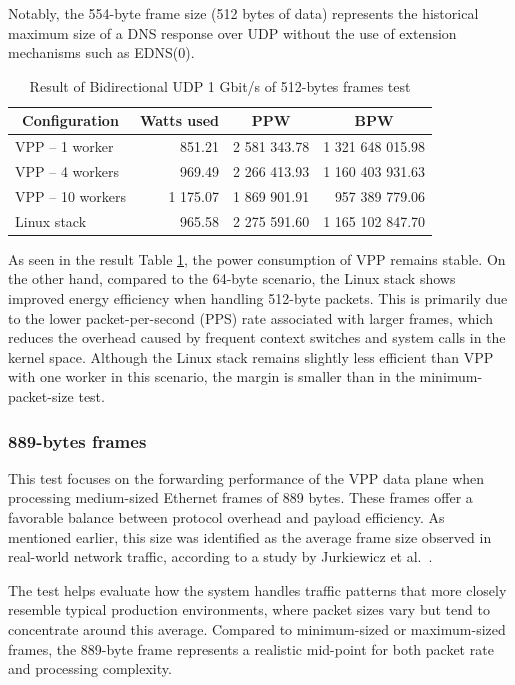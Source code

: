 Notably, the 554-byte frame size (512 bytes of data) represents the historical maximum size of a DNS response over UDP without the use of extension mechanisms such as EDNS(0).\cite{satrapa2023dns} 

\begin{table}[h!]
\centering
\begin{tabular}{|l|r|r|r|}
\hline
\multicolumn{1}{|c|}{\textbf{Configuration}} &
\multicolumn{1}{c|}{\textbf{Watts used}} &
\multicolumn{1}{c|}{\textbf{PPW}} &
\multicolumn{1}{c|}{\textbf{BPW}} \\
\hline
VPP -- 1 worker & 851.21 & 2 581 343.78 & 1 321 648 015.98 \\
VPP -- 4 workers & 969.49 & 2 266 413.93 & 1 160 403 931.63 \\
VPP -- 10 workers & 1 175.07 & 1 869 901.91 & 957 389 779.06 \\
Linux stack & 965.58 & 2 275 591.60 & 1 165 102 847.70 \\
\hline
\end{tabular}
\caption{Result of Bidirectional UDP 1 Gbit/s of 512-bytes frames test}
\label{tab:udp:two}
\end{table}

As seen in the result Table \ref{tab:udp:two}, the power consumption of VPP remains stable. 
On the other hand, compared to the 64-byte scenario, the Linux stack shows improved energy efficiency when handling 512-byte packets. 
This is primarily due to the lower packet-per-second (PPS) rate associated with larger frames, which reduces the overhead caused by frequent context switches and system calls in the kernel space. 
Although the Linux stack remains slightly less efficient than VPP with one worker in this scenario, the margin is smaller than in the minimum-packet-size test.

\subsubsection{889-bytes frames}
This test focuses on the forwarding performance of the VPP data plane when processing medium-sized Ethernet frames of 889 bytes. 
These frames offer a favorable balance between protocol overhead and payload efficiency. 
As mentioned earlier, this size was identified as the average frame size observed in real-world network traffic, according to a study by Jurkiewicz et al.~\cite{JURKIEWICZ202115}.

The test helps evaluate how the system handles traffic patterns that more closely resemble typical production environments, where packet sizes vary but tend to concentrate around this average. 
Compared to minimum-sized or maximum-sized frames, the 889-byte frame represents a realistic mid-point for both packet rate and processing complexity.

